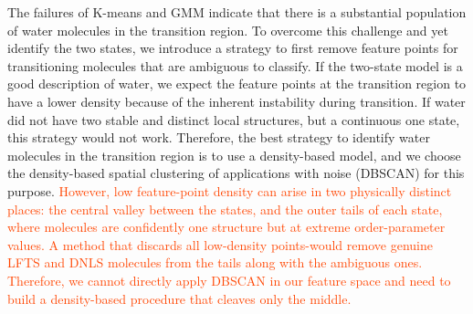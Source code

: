 \documentclass[aps, amsmath,amssymb, reprint, twocolumn, superscriptaddress]{revtex4-2}
\newcommand{\edit}[1]{\textcolor{OrangeRed}{#1}}
\begin{document}
The failures of K-means and GMM indicate that there is a substantial population of water molecules in the transition region. To overcome this challenge and yet identify the two states, we introduce a strategy to first remove feature points for transitioning molecules that are ambiguous to classify. If the two-state model is a good description of water, we expect the feature points at the transition region to have a lower density because of the inherent instability during transition. If water did not have two stable and distinct local structures, but a continuous one state, this strategy would not work. Therefore, the best strategy to identify water molecules in the transition region is to use a density-based model, and we choose the density-based spatial clustering of applications with noise (DBSCAN) for this purpose. \cite{ester_density-based_1996} \edit{However, low feature-point density can arise in two physically distinct places: the central valley between the states, and the outer tails of each state, where molecules are confidently one structure but at extreme order-parameter values. A method that discards all low-density points-would remove genuine LFTS and DNLS molecules from the tails along with the ambiguous ones. Therefore, we cannot directly apply DBSCAN in our feature space and need to build a density-based procedure that cleaves only the middle.}

\end{document}
